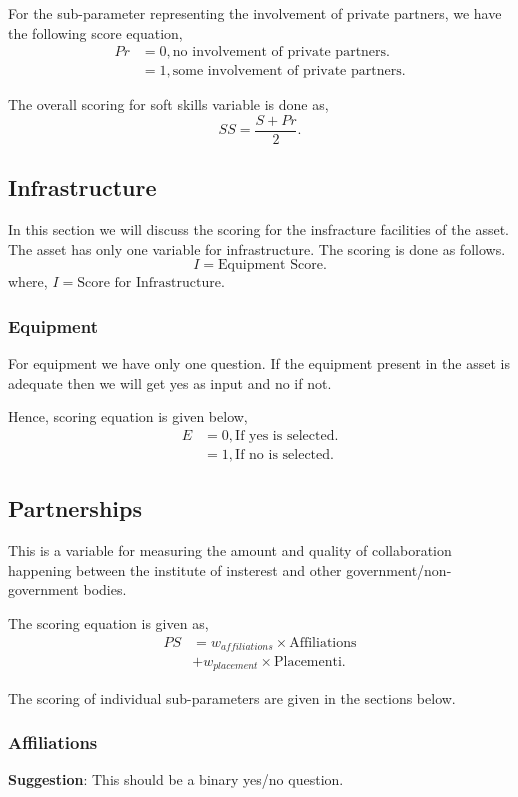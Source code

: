 \documentclass[oneside,twocolumn]{article}
\begin{document}
For the sub-parameter representing the involvement of private
partners, we have the following score equation,
\begin{align*}
	Pr &= 0, \text{no involvement of private partners.} \\
	   &= 1, \text{some involvement of private partners.}
\end{align*}

The overall scoring for soft skills variable is done as,
\[
	SS = \dfrac{S+Pr}{2}.
\]

\subsection{Infrastructure}
In this section we will discuss the scoring for the insfracture
facilities of the asset. The asset has only one variable for
infrastructure. The scoring is done as follows.
\[
	I = \text{Equipment Score}.
\]
where, \(I = \text{Score for Infrastructure.}\)
\subsubsection{Equipment}
For equipment we have only one question. If the equipment present
in the asset is adequate then we will get yes as input and no if not.

Hence, scoring equation is given below,
\begin{align*}
	E &= 0, \text{If yes is selected.} \\
	  &= 1, \text{If no is selected.}
\end{align*}

\subsection{Partnerships}
This is a variable for measuring the amount and quality of
collaboration happening between the institute of insterest
and other government/non-government bodies.

The scoring equation is given as,
\begin{align*}
	PS &= w_{affiliations} \times \text{Affiliations} \\
	   &+ w_{placement} \times \text{Placementi.}
\end{align*}

The scoring of individual sub-parameters are given in the
sections below.
\subsubsection{Affiliations}
\textbf{Suggestion}: This should be a binary yes/no question. \\ 
\end{document}
